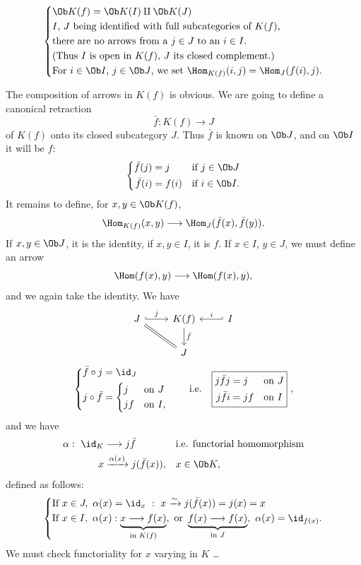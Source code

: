 \[
\left\{
\begin{aligned}
&\Ob K(f) = \Ob K(I) \amalg \Ob K(J) \qquad \\
&\text{$I$, $J$ being identified with full subcategories of $K(f)$,}\\
&\text{there are no arrows from a $j \in J$ to an $i \in I$.}\\
&\text{(Thus $I$ is open in $K(f)$, $J$ its closed complement.)}\\
&\text{For $i \in \Ob I$, $j \in \Ob J$, we set $\Hom_{K(f)}(i,j) = \Hom_J(f(i),j)$.}
\end{aligned}
\right.
\]

The composition of arrows in $K(f)$ is obvious. We are going to define a canonical retraction
\[ \bar{f} : K(f) \longrightarrow J \]
of $K(f)$ onto its closed subcategory $J$. Thus $\bar{f}$ is known on $\Ob J$, and on $\Ob I$ it will be $f$:
\[
\left\{
\begin{aligned}
\bar{f}(j) &= j && \text{if } j \in \Ob J\\
\bar{f}(i) &= f(i) && \text{if } i \in \Ob I.
\end{aligned}
\right.
\]
It remains to define, for $x, y \in \Ob K(f)$,
\[ \Hom_{K(f)}(x,y) \longrightarrow \Hom_J(\bar{f}(x), \bar{f}(y)). \]
If $x, y \in \Ob J$, it is the identity, if $x, y \in I$, it is $f$. If $x \in I$, $y \in J$, we must define an arrow
\[ \Hom(f(x),y) \longrightarrow \Hom(f(x),y), \]
and we again take the identity. We have
\[
\begin{tikzcd}
J \arrow[r, hook, "j"] \arrow[dr, equal] & K(f) \arrow[d, "\bar{f}"] & I \arrow[l, hook', "i"'] \\
& J &
\end{tikzcd}
\]
\[
\left\{
\begin{aligned}
\bar{f} \circ j &= \id_J\\
j \circ \bar{f} &= \left\{
\begin{aligned}
&j && \text{on } J\\
&jf && \text{on } I,
\end{aligned}
\right.
\end{aligned}
\right.
\qquad \text{i.e.} \quad
\boxed{
\begin{aligned}
j\bar{f}j &= j && \text{on } J\\
j\bar{f}i &= jf && \text{on } I
\end{aligned}
}\ ,
\]
and we have 
\[
\begin{aligned}
\alpha :\ \id_K &\longrightarrow j\bar{f} && \text{i.e. functorial homomorphism}\\
x &\xrightarrow{\alpha(x)} j(\bar{f}(x)), && x \in \Ob K,
\end{aligned}
\]
defined as follows:
\[
\left\{
\begin{aligned}
&\text{If } x \in J,\ \alpha(x) = \id_x\ :\ x \xrightarrow{\sim} j(\bar{f}(x)) = j(x) = x\\
&\text{If } x \in I,\ \alpha(x) : \underbrace{x \longrightarrow f(x)}_{\text{in } K(f)},\ \text{or } \underbrace{f(x) \longrightarrow f(x)}_{\text{in } J},\ \alpha(x) = \id_{f(x)}.
\end{aligned}
\right.
\]
We must check functoriality for $x$ varying in $K$ \dots


